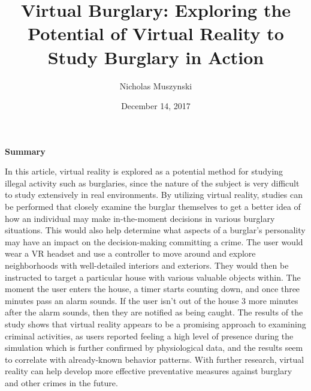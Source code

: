 \documentclass{article}
\begin{document}
\title{Virtual Burglary: Exploring the Potential of Virtual Reality to Study Burglary in Action}
\author{Nicholas Muszynski}
\date{December 14, 2017}

\maketitle

\textbf{Summary}
\newline

In this article, virtual reality is explored as a potential method for studying illegal activity such as burglaries, since the nature of the subject is very difficult to study extensively in real environments. By utilizing virtual reality, studies can be performed that closely examine the burglar themselves to get a better idea of how an individual may make in-the-moment decisions in various burglary situations. This would also help determine what aspects of a burglar's personality may have an impact on the decision-making committing a crime. The user would wear a VR headset and use a controller to move around and explore neighborhoods with well-detailed interiors and exteriors. They would then be instructed to target a particular house with various valuable objects within. The moment the user enters the house, a timer starts counting down, and once three minutes pass an alarm sounds. If the user isn't out of the house 3 more minutes after the alarm sounds, then they are notified as being caught. The results of the study shows that virtual reality appears to be a promising approach to examining criminal activities, as users reported feeling a high level of presence during the simulation which is further confirmed by physiological data, and the results seem to correlate with already-known behavior patterns. With further research, virtual reality can help develop more effective preventative measures against burglary and other crimes in the future.

\nocite{virtualBurglaryCite}



\end{document}
